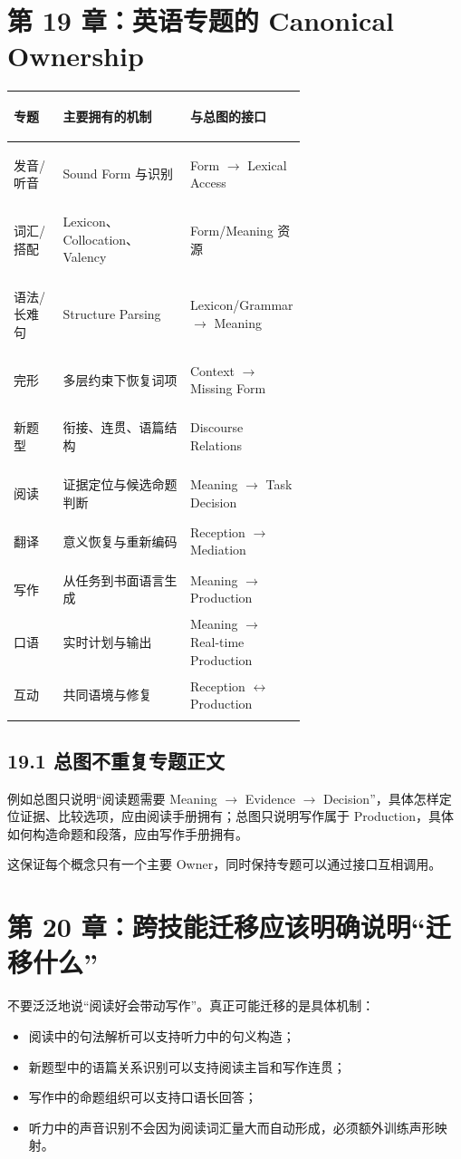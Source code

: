 \documentclass[11pt,a4paper]{ctexart}
\begin{document}
\section{第 19 章：英语专题的 Canonical Ownership}
\begin{center}
\small
\begin{tabularx}{\linewidth}{>{\bfseries\raggedright\arraybackslash}p{0.18\linewidth} >{\raggedright\arraybackslash}p{0.46\linewidth} Y}
\toprule
专题 & 主要拥有的机制 & 与总图的接口 \\
\midrule
发音/听音 & Sound Form 与识别 & Form $\rightarrow$ Lexical Access \\
词汇/搭配 & Lexicon、Collocation、Valency & Form/Meaning 资源 \\
语法/长难句 & Structure Parsing & Lexicon/Grammar $\rightarrow$ Meaning \\
完形 & 多层约束下恢复词项 & Context $\rightarrow$ Missing Form \\
新题型 & 衔接、连贯、语篇结构 & Discourse Relations \\
阅读 & 证据定位与候选命题判断 & Meaning $\rightarrow$ Task Decision \\
翻译 & 意义恢复与重新编码 & Reception $\rightarrow$ Mediation \\
写作 & 从任务到书面语言生成 & Meaning $\rightarrow$ Production \\
口语 & 实时计划与输出 & Meaning $\rightarrow$ Real-time Production \\
互动 & 共同语境与修复 & Reception $\leftrightarrow$ Production \\
\bottomrule
\end{tabularx}
\end{center}

\subsection{19.1 总图不重复专题正文}
例如总图只说明“阅读题需要 Meaning $\rightarrow$ Evidence $\rightarrow$ Decision”，具体怎样定位证据、比较选项，应由阅读手册拥有；总图只说明写作属于 Production，具体如何构造命题和段落，应由写作手册拥有。

这保证每个概念只有一个主要 Owner，同时保持专题可以通过接口互相调用。

\section{第 20 章：跨技能迁移应该明确说明“迁移什么”}
不要泛泛地说“阅读好会带动写作”。真正可能迁移的是具体机制：
\begin{itemize}
  \item 阅读中的句法解析可以支持听力中的句义构造；
  \item 新题型中的语篇关系识别可以支持阅读主旨和写作连贯；
  \item 写作中的命题组织可以支持口语长回答；
  \item 听力中的声音识别不会因为阅读词汇量大而自动形成，必须额外训练声形映射。
\end{itemize}
\end{document}
